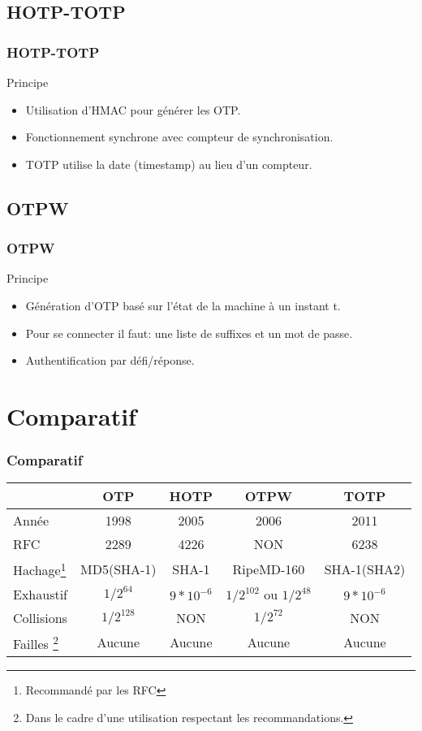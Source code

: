 \documentclass{beamer}
\begin{document}
\subsection{HOTP-TOTP}
\begin{frame}
\frametitle{HOTP-TOTP}
 \begin{block}{Principe}
 \begin{itemize}
 \item Utilisation d'HMAC pour générer les OTP.
 \item Fonctionnement synchrone avec compteur de synchronisation.
 \item TOTP utilise la date (timestamp) au lieu d'un compteur.
 \end{itemize}
 \end{block}
\end{frame}

\subsection{OTPW}
\begin{frame}
\frametitle{OTPW}
  \begin{block}{Principe}
   \begin{itemize}
    \item Génération d'OTP basé sur l'état de la machine à un instant t.
    \item Pour se connecter il faut: une liste de suffixes et un mot de passe.
    \item Authentification par défi/réponse.
   \end{itemize}
  \end{block}
\end{frame}


\section{Comparatif}
\begin{frame}
  \frametitle{Comparatif}
  \begin{tabular}{|l|c|c|c|c|}
 \hline
 & OTP & HOTP & OTPW & TOTP\\
 \hline
 Année & 1998 & 2005 & 2006 & 2011 \\
 \hline
 RFC & 2289 & 4226 & NON & 6238 \\
 \hline
 Hachage\footnote{Recommandé par les RFC} & MD5(SHA-1) & SHA-1 & RipeMD-160 & SHA-1(SHA2)\\
 \hline
 Exhaustif & $1/2^{64}$ & $9*10^{-6} $ & $1/2^{102}$ ou $1/2^{48}$ & $9*10^{-6}$\\
 \hline
 Collisions & $1/2^{128}$ & NON & $1/2^{72}$ & NON\\
 \hline
 Failles \footnote{Dans le cadre d'une utilisation respectant les recommandations.} & Aucune & Aucune& Aucune &Aucune\\
 \hline
  \end{tabular}
\end{frame}
\end{document}
